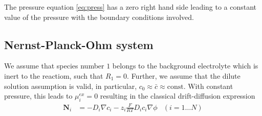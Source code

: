 \documentclass[12pt,oneside,reqno]{amsart}
\numberwithin{equation}{section}
\begin{document}
 The pressure equation \eqref{eq:press} has a zero right hand side leading to a
 constant value of the pressure with the boundary conditions involved.

\subsection{Nernst-Planck-Ohm system}

We assume that species number $1$ belongs to the background electrolyte which
is inert to  the reactiom, such that $R_1=0$. Further, we assume that 
the dilute solution assumption is valid, in particular, $c_0\approx\bar c\approx \mathrm{const}$.
With constant pressure, this leads to $\mu_i^{ex}=0$ resulting in 
the classical drift-diffusion expression
\begin{align}
  \mathbf N_i &= -D_i \nabla c_i  - z_i \frac{F}{RT} D_i c_i \nabla \phi \label{eq:ddflux} & (i=1\dots N)
\end{align}
\end{document}
